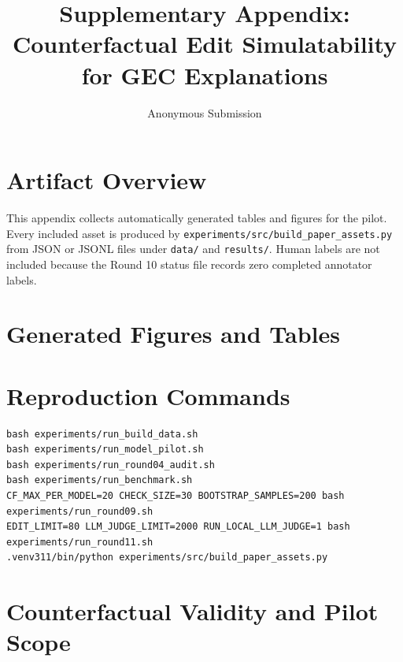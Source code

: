 \documentclass[letterpaper]{article}
\title{Supplementary Appendix: Counterfactual Edit Simulatability for GEC Explanations}
\author{Anonymous Submission}
\date{}
\begin{document}
\maketitle

\section{Artifact Overview}

This appendix collects automatically generated tables and figures for the pilot. Every included asset is produced by \texttt{experiments/src/build\_paper\_assets.py} from JSON or JSONL files under \texttt{data/} and \texttt{results/}. Human labels are not included because the Round 10 status file records zero completed annotator labels.

\section{Generated Figures and Tables}













\section{Reproduction Commands}

\begin{verbatim}
bash experiments/run_build_data.sh
bash experiments/run_model_pilot.sh
bash experiments/run_round04_audit.sh
bash experiments/run_benchmark.sh
CF_MAX_PER_MODEL=20 CHECK_SIZE=30 BOOTSTRAP_SAMPLES=200 bash experiments/run_round09.sh
EDIT_LIMIT=80 LLM_JUDGE_LIMIT=2000 RUN_LOCAL_LLM_JUDGE=1 bash experiments/run_round11.sh
.venv311/bin/python experiments/src/build_paper_assets.py
\end{verbatim}

\section{Counterfactual Validity and Pilot Scope}
\end{document}
